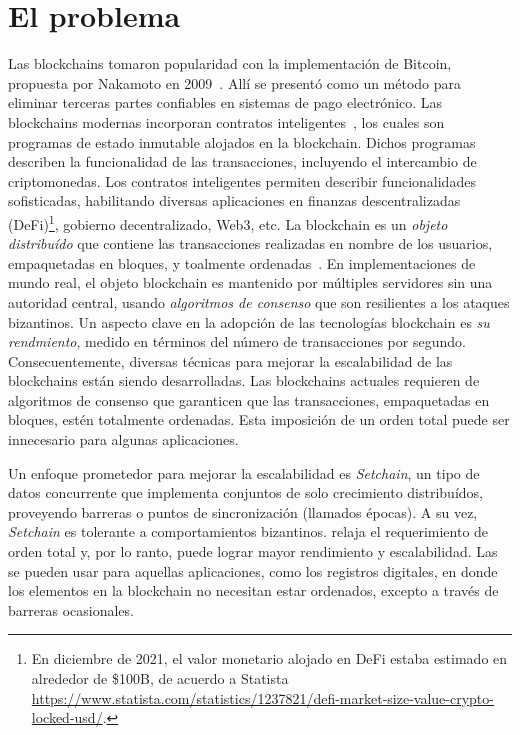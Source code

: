 
\section{El problema}
Las blockchains tomaron
popularidad con la implementación de Bitcoin, propuesta por Nakamoto en
2009~\cite{nakamoto06bitcoin}.
Allí se presentó como un método para eliminar terceras partes confiables en sistemas
de pago electrónico.
%
Las blockchains modernas incorporan contratos inteligentes~\cite{szabo96smart,ethereum},
los cuales son programas de estado inmutable alojados en la blockchain. Dichos
programas describen la funcionalidad de las transacciones, incluyendo el intercambio
de criptomonedas.
%
Los contratos inteligentes permiten describir funcionalidades sofisticadas, habilitando
diversas aplicaciones en finanzas descentralizadas (DeFi)\footnote{En diciembre de 2021,
el valor monetario alojado en DeFi estaba estimado en alrededor de \$100B, de acuerdo a Statista
\url{https://www.statista.com/statistics/1237821/defi-market-size-value-crypto-locked-usd/}.},
gobierno decentralizado, Web3, etc.
%
La blockchain es un \textit{objeto distribuído} que contiene las transacciones realizadas
en nombre de los usuarios, empaquetadas en bloques, y toalmente
ordenadas~\cite{anta2018formalizing,anta2021principles}.
%
En implementaciones de mundo real, el objeto blockchain es mantenido por múltiples servidores
sin una autoridad central, usando \emph{algoritmos de consenso} que son resilientes a los
ataques bizantinos.
%
Un aspecto clave en la adopción de las tecnologías blockchain es \emph{su rendmiento}, medido
en términos del número de transacciones por segundo.
%
Consecuentemente, diversas técnicas para mejorar la escalabilidad de las blockchains
están siendo desarrolladas.
%
Las blockchains actuales requieren de algoritmos de consenso que garanticen que las
transacciones, empaquetadas en bloques, estén totalmente ordenadas.
%
Esta imposición de un orden total puede ser innecesario para algunas aplicaciones.

%
Un enfoque prometedor para mejorar la escalabilidad es \textit{Setchain}, un tipo de
datos concurrente que implementa conjuntos de solo crecimiento distribuídos,
proveyendo barreras o puntos de sincronización (llamados épocas). A su vez,
\textit{Setchain} es tolerante a comportamientos bizantinos.
%
\setchain relaja el requerimiento de orden total y, por lo ranto, puede lograr mayor
rendimiento y escalabilidad.
%
Las \setchains se pueden usar para aquellas aplicaciones, como los registros digitales,
en donde los elementos en la blockchain no necesitan estar ordenados, excepto a través
de barreras ocasionales.

